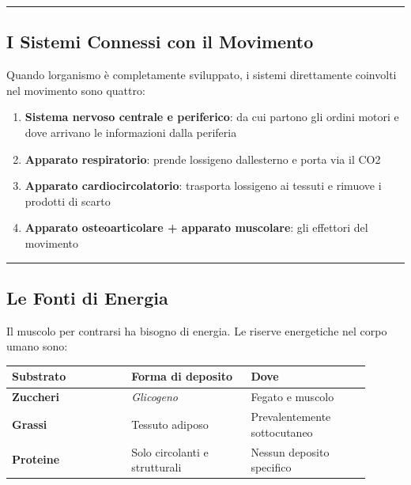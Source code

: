\documentclass[a4paper,11pt]{article}
\providecommand{\tightlist}{%
  \setlength{\itemsep}{0pt}\setlength{\parskip}{0pt}}
\begin{document}
\begin{center}\rule{0.5\linewidth}{0.5pt}\end{center}

\subsection{I Sistemi Connessi con il
      Movimento}\label{i-sistemi-connessi-con-il-movimento}

Quando l\textquotesingle organismo è completamente sviluppato, i sistemi
direttamente coinvolti nel movimento sono quattro:

\begin{enumerate}
      \tightlist
      \item
            \textbf{Sistema nervoso centrale e periferico}: da cui partono gli
            ordini motori e dove arrivano le informazioni dalla periferia
      \item
            \textbf{Apparato respiratorio}: prende l\textquotesingle ossigeno
            dall\textquotesingle esterno e porta via il CO2
      \item
            \textbf{Apparato cardiocircolatorio}: trasporta
            l\textquotesingle ossigeno ai tessuti e rimuove i prodotti di scarto
      \item
            \textbf{Apparato osteoarticolare + apparato muscolare}: gli effettori
            del movimento
\end{enumerate}

\begin{center}\rule{0.5\linewidth}{0.5pt}\end{center}

\subsection{Le Fonti di Energia}\label{le-fonti-di-energia}

Il muscolo per contrarsi ha bisogno di energia. Le riserve energetiche
nel corpo umano sono:

\begin{longtable}[]{@{}p{0.30\linewidth}p{0.30\linewidth}p{0.30\linewidth}@{}}
      \toprule\noalign{}
      Substrato         & Forma di deposito             & Dove                         \\
      \midrule\noalign{}
      \endhead
      \bottomrule\noalign{}
      \endlastfoot
      \textbf{Zuccheri} & \emph{Glicogeno}              & Fegato e muscolo             \\
      \textbf{Grassi}   & Tessuto adiposo               & Prevalentemente sottocutaneo \\
      \textbf{Proteine} & Solo circolanti e strutturali & Nessun deposito
      specifico                                                                        \\
\end{longtable}
\end{document}
